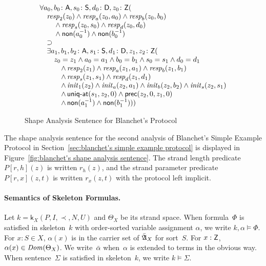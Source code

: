 \documentclass[12pt]{report}
\theoremstyle{definition}
\newcommand{\algbara}{\bar{\alg{A}}}
\newcommand{\sdom}{\fn{Dom}}
\newcommand{\skel}{\mathsf{k}}
\newcommand{\init}{\fn{init}}
\newcommand{\resp}{\fn{resp}}
\begin{document}
\begin{figure}
$$\begin{array}{l}
\all{a_0,b_0\colon\srt{A}, s_0\colon\srt{S}, d_0\colon\srt{D},
z_0\colon\srt{Z}}(\\
\quad\resp_2(z_0)\wedge\resp_{a}(z_0,a_0)\wedge
\resp_{b}(z_0,b_0)\\
\qquad{}\wedge
\resp_{s}(z_0,s_0)\wedge
\resp_{d}(z_0,d_0)\\
\qquad{}\wedge\cn{non}(a_0^{-1})\wedge
\cn{non}(b_0^{-1})\\
\quad\supset\\
\quad\some{a_1,b_1,b_2\colon\srt{A}, s_1\colon\srt{S},
  d_1\colon\srt{D}, z_1,z_2\colon
 \srt{Z}}(\\
\qquad z_0=z_1\wedge a_0=a_1\wedge b_0=b_1\wedge s_0=s_1\wedge
d_0=d_1\\
\qquad\quad\wedge\resp_2(z_1)\wedge
\resp_{a}(z_1,a_1)\wedge
\resp_{b}(z_1,b_1)\\
\qquad\quad\wedge
\resp_{s}(z_1,s_1)\wedge
\resp_{d}(z_1,d_1)\\
\qquad\quad\wedge\init_1(z_2)\wedge\init_a(z_2,a_1)\wedge
\init_b(z_2,b_2)\wedge
\init_s(z_2,s_1)\\
\qquad\quad\wedge\cn{\uniqat}(s_1,z_2,0)\wedge
\cn{prec}(z_2,0,z_1,0)\\
\qquad\quad\wedge\cn{non}(a_1^{-1})\wedge
\cn{non}(b_1^{-1})))
\end{array}$$
\caption{Shape Analysis Sentence for Blanchet's
  Protocol}\label{fig:blanchet's shape analysis sentence}
\end{figure}

The shape analysis sentence for the second analysis of Blanchet's
Simple Example Protocol in Section~\ref{sec:blanchet's simple example
  protocol} is displayed in Figure~\ref{fig:blanchet's shape analysis
  sentence}.  The strand length predicate $P[r,h](z)$ is written
$r_h(z)$, and the strand parameter predicate $P[r,x](z,t)$ is written
$r_x(z,t)$ with the protocol left implicit.

\paragraph{Semantics of Skeleton Formulas.}

Let $k=\skel_X(P,I,\prec,N,U)$ and $\Theta_X$ be its strand space.
When formula~$\Phi$ is satisfied in skeleton~$k$ with order-sorted
variable assignment $\alpha$, we write $k,\alpha\models\Phi$.  For
$x:S\in X$, $\alpha(x)$ is in the carrier set of $\algbara_X$ for
sort~$S$.  For $x:\mathsf{Z}$, $\alpha(x)\in\sdom(\Theta_X)$.  We
write~$\bar\alpha$ when~$\alpha$ is extended to terms in the obvious
way.  When sentence~$\Sigma$ is satisfied in skeleton~$k$, we write
$k\models\Sigma$.
\end{document}
